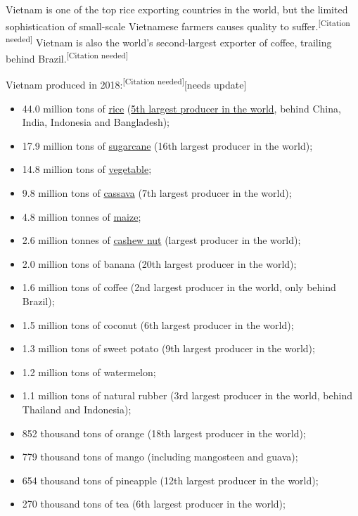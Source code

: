 \documentclass{article}
\begin{document}
Vietnam is one of the top rice exporting countries in the world, but the limited sophistication of small-scale Vietnamese farmers causes quality to suff\-er.\textsuperscript{[Citation needed]} Vietnam is also the world's second-largest exporter of coffee, trailing behind Brazil.\textsuperscript{[Citation needed]}

Vietnam produced in 2018:\textsuperscript{[Citation needed]}[needs update]

\begin{itemize}
    \item 44.0 million tons of \href{https://en.wikipedia.org/wiki/Rice}{rice} (\href{https://en.wikipedia.org/wiki/Rice_production_in_Vietnam}{5th largest producer in the world}, behind China, India, Indonesia and Bangladesh);
    \item 17.9 million tons of \href{https://en.wikipedia.org/wiki/Sugarcane}{sugarcane} (16th largest producer in the world);
    \item 14.8 million tons of \href{https://en.wikipedia.org/wiki/Vegetable}{vegetable};
    \item 9.8 million tons of \href{https://en.wikipedia.org/wiki/Cassava}{cassava} (7th largest producer in the world);
    \item 4.8 million tonnes of \href{https://en.wikipedia.org/wiki/Maize}{maize};
    \item 2.6 million tonnes of \href{https://en.wikipedia.org/wiki/Cashew_nut}{cashew nut} (largest producer in the world);
    \item 2.0 million tons of banana (20th largest producer in the world);
    \item 1.6 million tons of coffee (2nd largest producer in the world, only behind Brazil);
    \item 1.5 million tons of coconut (6th largest producer in the world);
    \item 1.3 million tons of sweet potato (9th largest producer in the world);
    \item 1.2 million tons of watermelon;
    \item 1.1 million tons of natural rubber (3rd largest producer in the world, behind Thailand and Indonesia);
    \item 852 thousand tons of orange (18th largest producer in the world);
    \item 779 thousand tons of mango (including mangosteen and guava);
    \item 654 thousand tons of pineapple (12th largest producer in the world);
    \item 270 thousand tons of tea (6th largest producer in the world);
\end{itemize}
\end{document}

